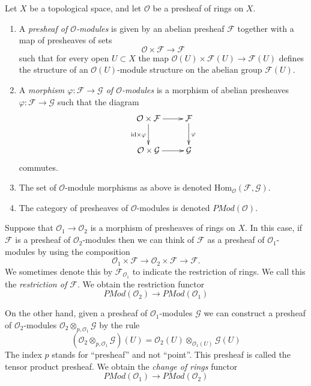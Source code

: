 \begin{definition}
\label{definition-presheaf-modules}
Let $X$ be a topological space, and let $\mathcal{O}$ be
a presheaf of rings on $X$.
\begin{enumerate}
\item A {\it presheaf of $\mathcal{O}$-modules}
is given by an abelian presheaf $\mathcal{F}$ together with a
map of presheaves of sets
$$
\mathcal{O} \times \mathcal{F} \longrightarrow \mathcal{F}
$$
such that for every open $U \subset X$ the map
$\mathcal{O}(U) \times \mathcal{F}(U) \to \mathcal{F}(U)$ 
defines the structure of an $\mathcal{O}(U)$-module
structure on the abelian group $\mathcal{F}(U)$.
\item A {\it morphism $\varphi : \mathcal{F} \to \mathcal{G}$
of $\mathcal{O}$-modules} is a morphism of abelian presheaves
$\varphi : \mathcal{F} \to \mathcal{G}$ such that
the diagram
$$
\xymatrix{
\mathcal{O} \times \mathcal{F} \ar[r] \ar[d]_{\text{id}\times \varphi} &
\mathcal{F} \ar[d]^{\varphi} \\
\mathcal{O} \times \mathcal{G} \ar[r] &
\mathcal{G}
}
$$
commutes.
\item The set of $\mathcal{O}$-module morphisms as above is
denoted $\text{Hom}_{\mathcal{O}}(\mathcal{F}, \mathcal{G})$.
\item The category of presheaves of $\mathcal{O}$-modules
is denoted $\textit{PMod}(\mathcal{O})$.
\end{enumerate}
\end{definition}

\noindent
Suppose that $\mathcal{O}_1 \to \mathcal{O}_2$ is a
morphism of presheaves of rings on $X$. In this case,
if $\mathcal{F}$ is a presheaf of $\mathcal{O}_2$-modules
then we can think of $\mathcal{F}$ as a presheaf of
$\mathcal{O}_1$-modules by using the composition
$$
\mathcal{O}_1 \times \mathcal{F}
\to
\mathcal{O}_2 \times \mathcal{F}
\to
\mathcal{F}.
$$
We sometimes denote this by $\mathcal{F}_{\mathcal{O}_1}$
to indicate the restriction of rings. We call this
the {\it restriction of $\mathcal{F}$}. We obtain the
restriction functor
$$
\textit{PMod}(\mathcal{O}_2)
\longrightarrow
\textit{PMod}(\mathcal{O}_1)
$$

\medskip\noindent
On the other hand, given a presheaf of $\mathcal{O}_1$-modules
$\mathcal{G}$
we can construct a presheaf of $\mathcal{O}_2$-modules
$\mathcal{O}_2 \otimes_{p,\mathcal{O}_1} \mathcal{G}$
by the rule
$$
\left(\mathcal{O}_2 \otimes_{p,\mathcal{O}_1} \mathcal{G}\right)(U)
=
\mathcal{O}_2(U) \otimes_{\mathcal{O}_1(U)} \mathcal{G}(U)
$$
The index $p$ stands for ``presheaf'' and not ``point''.
This presheaf is called the tensor product presheaf. We obtain
the {\it change of rings} functor
$$
\textit{PMod}(\mathcal{O}_1)
\longrightarrow
\textit{PMod}(\mathcal{O}_2)
$$

